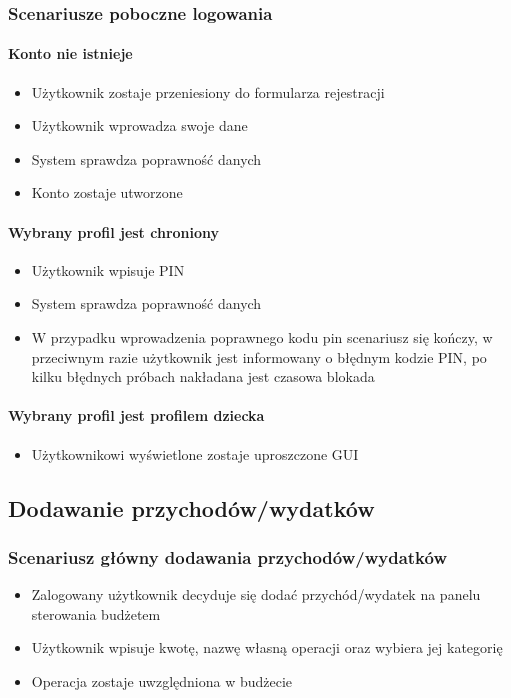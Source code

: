 \documentclass[12pt,a4paper,oneside]{article}
\begin{document}
\subsubsection{Scenariusze poboczne logowania}
\paragraph{Konto nie istnieje}
\begin{itemize}
    \item Użytkownik zostaje przeniesiony do formularza rejestracji
    \item Użytkownik wprowadza swoje dane
    \item System sprawdza poprawność danych
    \item Konto zostaje utworzone
\end{itemize}

\paragraph{Wybrany profil jest chroniony}
\begin{itemize}
    \item Użytkownik wpisuje PIN
    \item System sprawdza poprawność danych
    \item W przypadku wprowadzenia poprawnego kodu pin scenariusz się kończy,
          w przeciwnym razie użytkownik jest informowany o błędnym kodzie PIN,
          po kilku błędnych próbach nakładana jest czasowa blokada
\end{itemize}

\paragraph{Wybrany profil jest profilem dziecka}
\begin{itemize}
    \item Użytkownikowi wyświetlone zostaje uproszczone GUI
\end{itemize}

\subsection{Dodawanie przychodów/wydatków}
\subsubsection{Scenariusz główny dodawania przychodów/wydatków}
\begin{itemize}
    \item Zalogowany użytkownik decyduje się dodać przychód/wydatek na panelu
          sterowania budżetem
    \item Użytkownik wpisuje kwotę, nazwę własną operacji oraz wybiera jej
          kategorię
    \item Operacja zostaje uwzględniona w budżecie
\end{itemize}
\end{document}
